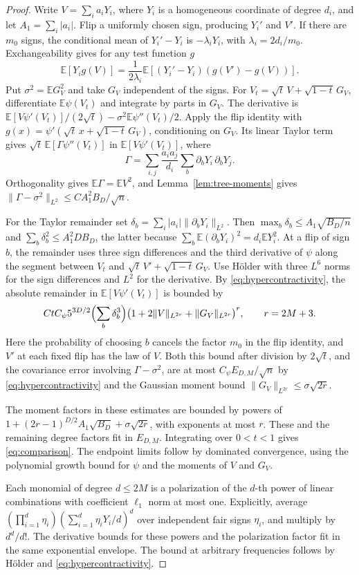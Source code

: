 \documentclass[11pt,letterpaper]{article}
\newcommand{\E}{\mathbb E}
\newcommand{\abs}[1]{\lvert #1\rvert}
\newcommand{\norm}[1]{\lVert #1\rVert}
\begin{document}
\begin{proof}
Write \(V=\sum_i a_iY_i\), where \(Y_i\) is a homogeneous coordinate of
degree \(d_i\), and let \(A_1=\sum_i\abs{a_i}\). Flip a uniformly chosen
sign, producing \(Y_i'\) and \(V'\). If there are \(m_0\) signs, the
conditional mean of \(Y_i'-Y_i\) is \(-\lambda_iY_i\), with
\(\lambda_i=2d_i/m_0\). Exchangeability gives for any test function \(g\)
\[
 \E[Y_i g(V)]=\frac{1}{2\lambda_i}
       \E[(Y_i'-Y_i)(g(V')-g(V))].
\]
Put \(\sigma^2=\E G_V^2\) and take \(G_V\) independent of the signs.
For \(V_t=\sqrt t\,V+\sqrt{1-t}\,G_V\), differentiate
\(\E \psi(V_t)\) and integrate by parts in \(G_V\). The derivative is
\(\E[V \psi'(V_t)]/(2\sqrt t)-\sigma^2\E \psi''(V_t)/2\).
Apply the flip identity with \(g(x)=\psi'(\sqrt t\,x+\sqrt{1-t}\,G_V)\),
conditioning on \(G_V\). Its linear Taylor term gives
\(\sqrt t\,\E[\Gamma \psi''(V_t)]\) in \(\E[V\psi'(V_t)]\), where
\[
 \Gamma=\sum_{i,j}\frac{a_i a_j}{d_i}
                  \sum_b\partial_bY_i\,\partial_bY_j.
\]
Orthogonality gives \(\E\Gamma=\E V^2\), and Lemma~\ref{lem:tree-moments}
gives \(\norm{\Gamma-\sigma^2}_{L^2}\le C A_1^2 B_D/\sqrt n\).

For the Taylor remainder set \(\delta_b=\sum_i\abs{a_i}\norm{\partial_bY_i}_{L^2}\).
Then \(\max_b \delta_b\le A_1\sqrt{B_D/n}\) and
\(\sum_b \delta_b^2\le A_1^2 D B_D\), the latter because
\(\sum_b\E(\partial_bY_i)^2=d_i\E Y_i^2\).
At a flip of sign \(b\), the remainder uses three sign differences
and the third derivative of \(\psi\) along the segment between
\(V_t\) and \(\sqrt t\,V'+\sqrt{1-t}\,G_V\).
Use H\"older with three \(L^6\) norms for the sign differences and
\(L^2\) for the derivative. By \eqref{eq:hypercontractivity}, the
absolute remainder in \(\E[V\psi'(V_t)]\) is bounded by
\[
 C t C_\psi 5^{3D/2}\Bigl(\sum_b \delta_b^3\Bigr)
     \bigl(1+2\norm V_{L^{2r}}+\norm{G_V}_{L^{2r}}\bigr)^r,
 \qquad r=2M+3.
\]
Here the probability of choosing \(b\) cancels the factor \(m_0\) in
the flip identity, and \(V'\) at each fixed flip has the law of \(V\).
Both this bound after division by \(2\sqrt t\), and the covariance
error involving \(\Gamma-\sigma^2\), are at most \(C_\psi E_{D,M}/\sqrt n\)
by \eqref{eq:hypercontractivity} and the Gaussian moment bound
\(\norm{G_V}_{L^{2r}}\le\sigma\sqrt{2r}\).

The moment factors in these estimates are bounded by powers of
\(1+(2r-1)^{D/2}A_1\sqrt{B_D}+\sigma\sqrt{2r}\), with exponents at
most \(r\). These and the remaining degree factors fit in \(E_{D,M}\).
Integrating over \(0<t<1\) gives \eqref{eq:comparison}. The endpoint
limits follow by dominated convergence, using the polynomial growth
bound for \(\psi\) and the moments of \(V\) and \(G_V\).

Each monomial of degree \(d\le 2M\) is a polarization of the \(d\)-th
power of linear combinations with coefficient \(\ell_1\) norm at
most one. Explicitly, average
\((\prod_{i=1}^d\eta_i)(\sum_{i=1}^d\eta_iY_i/d)^d\) over independent
fair signs \(\eta_i\), and multiply by \(d^d/d!\). The derivative
bounds for these powers and the polarization factor fit in the
same exponential envelope. The bound at arbitrary frequencies
follows by H\"older and \eqref{eq:hypercontractivity}.
\end{proof}
\end{document}

